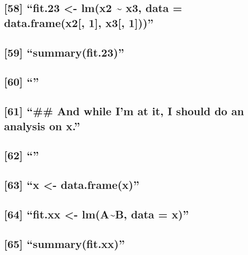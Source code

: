 \documentclass[]{article}
\begin{document}
\subsection{\texorpdfstring{{[}58{]} ``fit.23 \textless{}- lm(x2
\textasciitilde{} x3, data = data.frame(x2{[}, 1{]}, x3{[},
1{]}))''}{{[}58{]} fit.23 \textless{}- lm(x2 \textasciitilde{} x3, data = data.frame(x2{[}, 1{]}, x3{[}, 1{]}))}}\label{fit.23---lmx2-x3-data-data.framex2-1-x3-1}

\subsection{\texorpdfstring{{[}59{]}
``summary(fit.23)''}{{[}59{]} summary(fit.23)}}\label{summaryfit.23}

\subsection{\texorpdfstring{{[}60{]} ``''}{{[}60{]} }}\label{section-16}

\subsection{\texorpdfstring{{[}61{]} ``\#\# And while I'm at it, I
should do an analysis on
x.''}{{[}61{]} \#\# And while I'm at it, I should do an analysis on x.}}\label{and-while-im-at-it-i-should-do-an-analysis-on-x.}

\subsection{\texorpdfstring{{[}62{]} ``''}{{[}62{]} }}\label{section-17}

\subsection{\texorpdfstring{{[}63{]} ``x \textless{}-
data.frame(x)''}{{[}63{]} x \textless{}- data.frame(x)}}\label{x---data.framex}

\subsection{\texorpdfstring{{[}64{]} ``fit.xx \textless{}-
lm(A\textasciitilde{}B, data =
x)''}{{[}64{]} fit.xx \textless{}- lm(A\textasciitilde{}B, data = x)}}\label{fit.xx---lmab-data-x}

\subsection{\texorpdfstring{{[}65{]}
``summary(fit.xx)''}{{[}65{]} summary(fit.xx)}}\label{summaryfit.xx}
\end{document}
